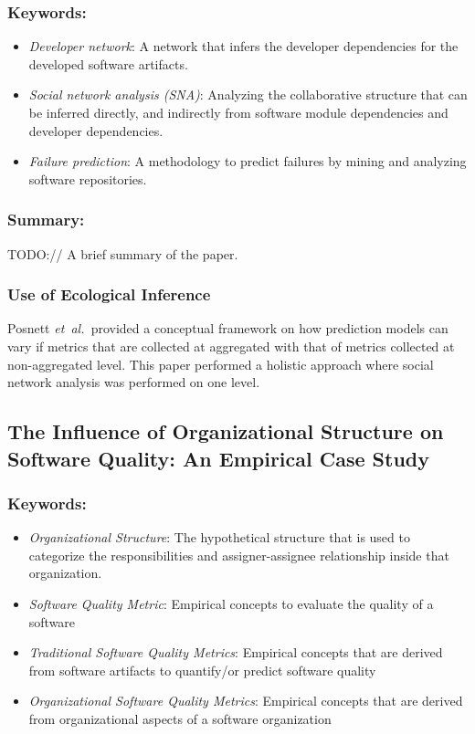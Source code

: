 \documentclass{sig-alternate-05-2015}
\newcommand{\etal}{\mbox{\emph{et al.\ }}}
\begin{document}
\subsubsection{Keywords:}
\begin{itemize}
\item \emph{Developer network}: A network that infers the developer dependencies for the developed software artifacts.
\item \emph{Social network analysis (SNA)}: Analyzing the collaborative structure that can be inferred directly, and indirectly from software module dependencies and developer dependencies.
\item \emph{Failure prediction}: A methodology to predict failures by mining and analyzing software repositories.
\end{itemize} 

\subsubsection{Summary:}
TODO:// A brief summary of the paper.

\subsubsection{Use of Ecological Inference}
Posnett \etal provided a conceptual framework on how prediction models can vary if metrics that are collected at aggregated with that of metrics collected at non-aggregated level. This paper performed a holistic approach where social network analysis was performed on one level.

\subsection{The Influence of Organizational Structure on Software Quality: An Empirical Case Study \cite{Nagappan:2008}}

\subsubsection{Keywords:}
\begin{itemize}
\item \emph{Organizational Structure}: The hypothetical structure that is used to categorize the responsibilities and assigner-assignee relationship inside that organization.
\item \emph{Software Quality Metric}: Empirical concepts to evaluate the quality of a software
\item \emph{Traditional Software Quality Metrics}: Empirical concepts that are derived from software artifacts to quantify/or predict software quality
\item \emph{Organizational Software Quality Metrics}: Empirical concepts that are derived from organizational aspects of a software organization
\end{itemize} 
\end{document}
